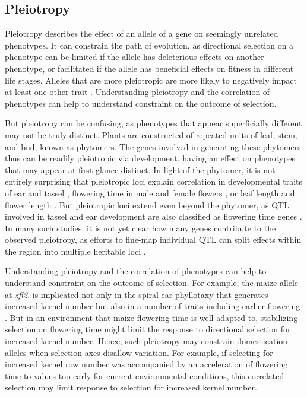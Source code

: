 \documentclass[9pt,twocolumn,twoside]{rilabRxiv}
\begin{document}
\subsection*{Pleiotropy}

﻿Pleiotropy describes the effect of an allele of a gene on seemingly unrelated phenotypes.
It can constrain the path of evolution, as directional selection on a phenotype can be limited if the allele has deleterious effects on another phenotype, or facilitated if the allele has beneficial effects on fitness in different life stages.
Alleles that are more pleiotropic are more likely to negatively impact at least one other trait \citep{fisher1918}.
﻿Understanding pleiotropy and the correlation of phenotypes can help to understand constraint on the outcome of selection.

﻿But pleiotropy  can be confusing, as phenotypes that appear superficially different may not be truly distinct.
Plants are constructed of repeated units of leaf, stem, and bud, known as phytomers.
The genes involved in generating these phytomers thus can be readily pleiotropic via development, having an effect on phenotypes that may appear at first glance distinct.
In light of the phytomer, it is not entirely surprising that pleiotropic loci explain correlation in developmental traits of ear and tassel \citep{brown2011}, flowering time in male and female flowers \citep{buckler2009}, or leaf length and flower length \citep{tian2011}.
But pleiotropic loci extend even beyond the phytomer, as QTL involved in tassel and ear development are also classified as flowering time genes \citep{xu2017}.
In many such studies, it is not yet clear how many genes contribute to the observed pleiotropy, as efforts to fine-map individual QTL can split effects within the region into multiple heritable loci \citep{lemmon2014dissect}.


﻿Understanding pleiotropy and the correlation of phenotypes can help to understand constraint on the outcome of selection.
For example, the maize allele at \textit{zfl2}, is implicated not only in the spiral ear phyllotaxy that generates increased kernel number but also in a number of traits including earlier flowering \citep{bomblies2006}. %
But in an environment that maize flowering time is well-adapted to, stabilizing selection on flowering time might limit the response to directional selection for increased kernel number. 
Hence, such pleiotropy may constrain domestication alleles when selection axes disallow variation.
For example, if selecting for increased kernel row number was accompanied by an acceleration of flowering time to values too early for current environmental conditions, this correlated selection may limit response to selection for increased kernel number.
\end{document}
